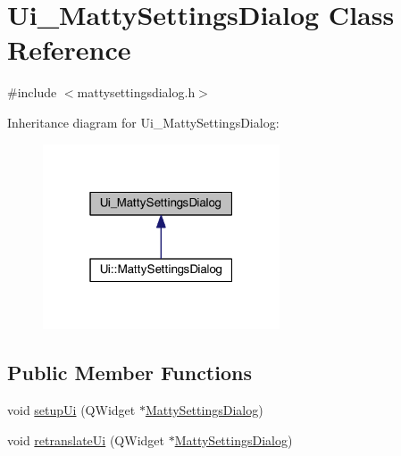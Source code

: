\hypertarget{classUi__MattySettingsDialog}{}\section{Ui\+\_\+\+Matty\+Settings\+Dialog Class Reference}
\label{classUi__MattySettingsDialog}


{\ttfamily \#include $<$mattysettingsdialog.\+h$>$}



Inheritance diagram for Ui\+\_\+\+Matty\+Settings\+Dialog\+:
\nopagebreak
\begin{figure}[H]
\begin{center}
\leavevmode
\includegraphics[width=199pt]{classUi__MattySettingsDialog__inherit__graph}
\end{center}
\end{figure}
\subsection*{Public Member Functions}
\begin{DoxyCompactItemize}
\item 
void \hyperlink{classUi__MattySettingsDialog_ad8d03029358c22b0342ea137f6d4edb9}{setup\+Ui} (Q\+Widget $\ast$\hyperlink{classMattySettingsDialog}{Matty\+Settings\+Dialog})
\item 
void \hyperlink{classUi__MattySettingsDialog_a63175c8e3ebbb59a8b60d126848a8825}{retranslate\+Ui} (Q\+Widget $\ast$\hyperlink{classMattySettingsDialog}{Matty\+Settings\+Dialog})
\end{DoxyCompactItemize}
